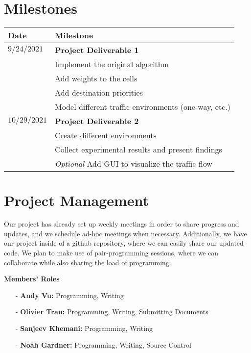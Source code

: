 \documentclass[sigplan,screen]{acmart}
\begin{document}
\section{Milestones}
\begin{tabular}{|l|l|}
    \hline
    \textbf{Date} & \textbf{Milestone}                                      \\
    \hline
    $9/24/2021$   & \textbf{Project Deliverable 1}                          \\
    \hline
                  & Implement the original algorithm                        \\
    \hline
                  & Add weights to the cells                                \\
    \hline
                  & Add destination priorities                              \\
    \hline
                  & Model different traffic environments (one-way, etc.)    \\
    \hline
    $10/29/2021$  & \textbf{Project Deliverable 2}                          \\
    \hline
                  & Create different environments                           \\
    \hline
                  & Collect experimental results and present findings       \\
    \hline
                  & \textit{Optional} Add GUI to visualize the traffic flow \\
    \hline
\end{tabular}


\section{Project Management}
Our project has already set up weekly meetings in order to share progress and
updates, and we schedule ad-hoc meetings when necessary. Additionally, we have
our project inside of a github repository, where we can easily share our updated
code. We plan to make use of pair-programming sessions, where we can collaborate
while also sharing the load of programming.

\textbf{Members' Roles}
\begin{itemize}

    \item[-] \textbf{Andy Vu:} Programming, Writing
    \item[-] \textbf{Olivier Tran:} Programming, Writing, Submitting Documents
    \item[-] \textbf{Sanjeev Khemani:} Programming, Writing
    \item[-] \textbf{Noah Gardner:} Programming, Writing, Source Control
\end{itemize}



\end{document}
